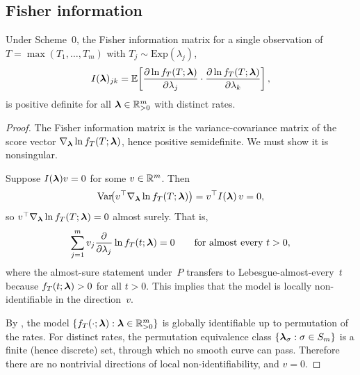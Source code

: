 \subsection{Fisher information}
\label{sec:fisher}

\begin{theorem}
\label{thm:fisher}
  Under Scheme~0, the Fisher information matrix for a single observation
  of $T = \max(T_1, \ldots, T_m)$ with $T_j \sim \mathrm{Exp}(\lambda_j)$,
  \begin{equation}\label{eq:fisher-def}
    I(\boldsymbol{\lambda})_{jk} = \mathbb{E}\!\left[
      \frac{\partial \ln f_T(T; \boldsymbol{\lambda})}{\partial \lambda_j}
      \cdot \frac{\partial \ln f_T(T; \boldsymbol{\lambda})}{\partial \lambda_k}
    \right],
  \end{equation}
  is positive definite for all $\boldsymbol{\lambda} \in \mathbb{R}_{>0}^m$ with distinct
  rates.
\end{theorem}

\begin{proof}
The Fisher information matrix is the variance-covariance matrix of the
score vector $\nabla_{\boldsymbol{\lambda}} \ln f_T(T; \boldsymbol{\lambda})$, hence positive
semidefinite.  We must show it is nonsingular.

Suppose $I(\boldsymbol{\lambda}) v = 0$ for some $v \in \mathbb{R}^m$.  Then
\[
  \mathrm{Var}\!\bigl(v^\top \nabla_{\boldsymbol{\lambda}} \ln f_T(T; \boldsymbol{\lambda})\bigr)
  = v^\top I(\boldsymbol{\lambda})\, v = 0,
\]
so $v^\top \nabla_{\boldsymbol{\lambda}} \ln f_T(T; \boldsymbol{\lambda}) = 0$ almost surely.  That
is,
\[
  \sum_{j=1}^m v_j \frac{\partial}{\partial \lambda_j}
  \ln f_T(t; \boldsymbol{\lambda}) = 0
  \qquad \text{for almost every } t > 0,
\]
where the almost-sure statement under~$P$ transfers to
Lebesgue-almost-every~$t$ because $f_T(t; \boldsymbol{\lambda}) > 0$ for all $t > 0$.
This implies that the model is locally
non-identifiable in the direction~$v$.

By , the model
$\{f_T(\cdot; \boldsymbol{\lambda}) : \boldsymbol{\lambda} \in \mathbb{R}_{>0}^m\}$ is globally
identifiable up to permutation of the rates.  For distinct rates, the
permutation equivalence class $\{\boldsymbol{\lambda}_\sigma : \sigma \in S_m\}$ is a
finite (hence discrete) set, through which no smooth curve can pass.
Therefore there are no
nontrivial directions of local non-identifiability, and $v = 0$.
\end{proof}

